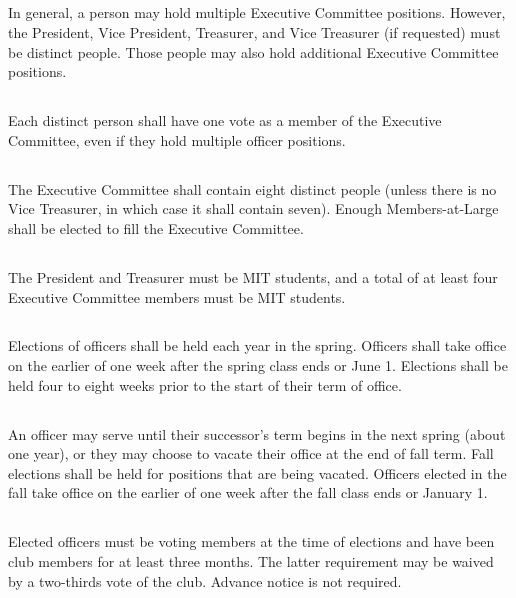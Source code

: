 \documentclass{bylaws}
\begin{document}
\subsection{}In general, a person may hold multiple Executive Committee positions. However, the President, Vice President, Treasurer, and Vice Treasurer (if requested) must be distinct people. Those people may also hold additional Executive Committee positions.
\subsection{}Each distinct person shall have one vote as a member of the Executive Committee, even if they hold multiple officer positions.
\subsection{}The Executive Committee shall contain eight distinct people (unless there is no Vice Treasurer, in which case it shall contain seven). Enough Members-at-Large shall be elected to fill the Executive Committee.
\subsection{}The President and Treasurer must be MIT students, and a total of at least four Executive Committee members must be MIT students.



\subsection{}Elections of officers shall be held each year in the spring. Officers shall take office on the earlier of one week after the spring class ends or June 1. Elections shall be held four to eight weeks prior to the start of their term of office.
\subsection{}An officer may serve until their successor's term begins in the next spring (about one year), or they may choose to vacate their office at the end of fall term. Fall elections shall be held for positions that are being vacated. Officers elected in the fall take office on the earlier of one week after the fall class ends or January 1.
\subsection{}Elected officers must be voting members at the time of elections and have been club members for at least three months. The latter requirement may be waived by a two-thirds vote of the club. Advance notice is not required.
\end{document}
